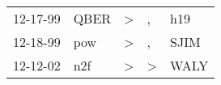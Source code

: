 \begin{supertabular}{lllll}
 12-17-99 &  QBER &  \textgreater &             , &   h19 \\
 12-18-99 &   pow &  \textgreater &             , &  SJIM \\
 12-12-02 &   n2f &  \textgreater &  \textgreater &  WALY \\
\end{supertabular}
